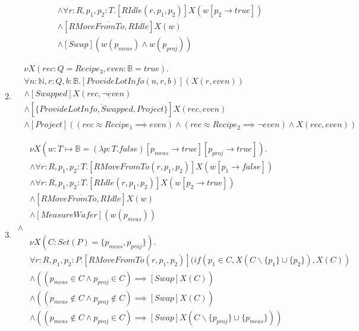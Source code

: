 \begin{enumerate}
\begin{align*}
            &\wedge \forall r:R, p_1,p_2 :T.[RIdle(r, p_1,p_2)]X(w[p_2\rightarrow true])\\
            &\wedge [\overline{RMoveFromTo, RIdle}]X(w)\\
            &\wedge [Swap](w(p_\textit{meas}) \wedge w(p_\textit{proj}))
        \end{align*}
    \item \begin{align*}
    	&\nu X(rec:Q = Recipe_3, even:\mathbb{B} = true).\\
  		&\forall n:\mathbb{N}, r:Q, b:\mathbb{B}.[ProvideLotInfo(n,r,b)](X(r,even))\\
  		&\wedge [Swapped]X(rec, \lnot even)\\
  		&\wedge [\overline{\{ProvideLotInfo, Swapped, Project\}}]X(rec, even)\\
  		&\wedge [Project]((rec \approx Recipe_1 \implies even) \wedge (rec \approx Recipe_2 \implies \lnot even) \wedge X(rec, even))
    \end{align*}
    \item \begin{align*}
            &\nu X(w:T\mapsto \mathbb{B} = (\lambda p:T.false)[p_\mathit{meas} \rightarrow true][p_\mathit{proj} \rightarrow true]). \\
            &\wedge \forall r:R, p_1,p_2 :T.[RMoveFromTo(r, p_1,p_2)]X(w[p_1\rightarrow false])\\
            &\wedge \forall r:R, p_1,p_2 :T.[RIdle(r, p_1,p_2)]X(w[p_2\rightarrow true])\\
            &\wedge [\overline{RMoveFromTo, RIdle}]X(w)\\
            &\wedge [MeasureWafer](w(p_\textit{meas}))\\
            \wedge\\
            &\nu X(C : Set(P) = \{p_\mathit{meas},p_\mathit{proj}\}).\\
            & \forall r:R, p_1, p_2 : P . [RMoveFromTo(r, p_1, p_2)](if(p_1 \in C, X(C\backslash\{p_1\}\cup\{p_2\}), X(C))\\
            &\wedge ((p_\mathit{meas} \in C \wedge p_\mathit{proj} \in C) \implies [Swap]X(C))\\
            &\wedge ((p_\mathit{meas} \notin C \wedge p_\mathit{proj} \notin C) \implies [Swap]X(C))\\
            &\wedge ((p_\mathit{meas} \notin C \wedge p_\mathit{proj} \in C) \implies [Swap]X(C\backslash\{p_\mathit{proj}\} \cup \{p_\mathit{meas}\}))\\

\end{align*}
\end{enumerate}

